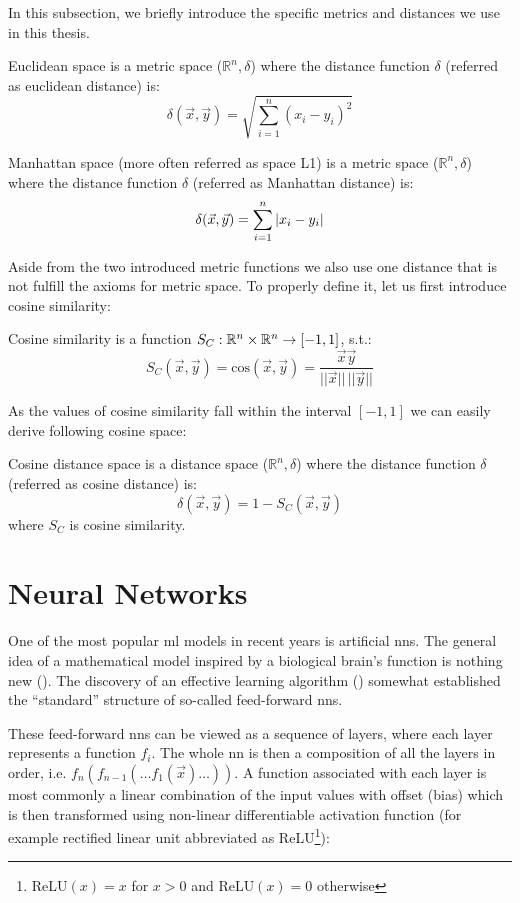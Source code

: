 In this subsection, we briefly introduce the specific metrics and distances we use in this thesis.

\begin{defn}
Euclidean space is a metric space ($\mathbb{R}^n, \delta$) where the
distance function $\delta$ (referred as euclidean distance) is:
$$\delta(\vec{x}, \vec{y}) = \sqrt{\sum_{i=1}^n(x_i - y_i)^2}$$
\end{defn}

\begin{defn}
Manhattan space (more often referred as space L1) is a metric
space ($\mathbb{R}^n, \delta$) where the
distance function $\delta$ (referred as Manhattan distance) is:
$$\delta(\vec{x}, \vec{y}) = \sum_{i=1}^n \left|{x_i - y_i}\right|$$
\end{defn}

Aside from the two introduced metric functions we also use one distance that is not fulfill the axioms for metric space. To properly define it, let us first introduce cosine similarity:

\begin{defn}
Cosine similarity is a function $S_C : \mathbb{R}^n \times \mathbb{R}^n \rightarrow [-1, 1]$, s.t.:
$$S_C(\vec{x}, \vec{y}) = \mathrm{cos}(\vec{x}, \vec{y}) = \frac{\vec{x}\vec{y}}{||\vec{x}||\,||\vec{y}||}$$
\end{defn}
As the values of cosine similarity fall within the interval $[-1,1]$ we can
easily derive following cosine space:
\begin{defn}
Cosine distance space is a distance space ($\mathbb{R}^n, \delta$) where the distance
function $\delta$ (referred as cosine distance) is:
$$\delta(\vec{x}, \vec{y}) = 1 - S_C(\vec{x}, \vec{y})$$
where $S_C$ is cosine similarity.
\end{defn}

\section{Neural Networks}
\label{sec:nn}

One of the most popular \gls{ml} models in recent years is artificial \glspl{nn}. The general idea of a mathematical model inspired by a biological brain's function is nothing new (\cite{first_nn}). The discovery of an effective learning algorithm (\cite{backprop}) somewhat established the ``standard'' structure of so-called feed-forward \glspl{nn}.

These feed-forward \glspl{nn} can be viewed as a sequence of layers, where each layer represents a function $f_i$. The whole \gls{nn} is then a composition of all the layers in order, i.e. $f_n(f_{n-1}(\ldots f_1(\vec{x})\ldots))$. A function associated with each layer is most commonly a linear combination of the input values with offset (bias) which is then transformed using non-linear differentiable activation function (for example rectified linear unit abbreviated as ReLU\footnote{$\mathrm{ReLU}(x) = x$ for $x > 0$ and $\mathrm{ReLU}(x) = 0$ otherwise}):

